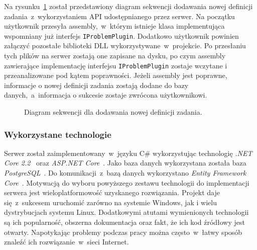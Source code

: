 \documentclass[a4paper,11pt,twoside]{report}
\theoremstyle{definition}
\begin{document}
Na rysunku~\ref{task-definition-sequence-diagram} został przedstawiony diagram sekwencji dodawania nowej definicji zadania~z~wykorzystaniem API udostępnianego przez serwer. 
Na początku użytkownik przesyła assembly,~w~którym istnieje klasa implementująca wspomniany już interfejs \texttt{IProblemPlugin}.
Dodatkowo użytkownik powinien załączyć pozostałe biblioteki DLL wykorzystywane~w~projekcie.
Po przesłaniu tych plików na serwer zostają one zapisane na dysku, po czym assembly zawierające implementację interfejsu \texttt{IProblemPlugin} zostaje wczytane i przeanalizowane pod kątem poprawności.
Jeżeli assembly jest poprawne, informacje o nowej definicji zadania zostają dodane do bazy danych,~a~informacja o sukcesie zostaje zwrócona użytkownikowi.

\begin{figure} 
    \caption{Diagram sekwencji dla dodawania nowej definicji zadania.}
    \label{task-definition-sequence-diagram}
\end{figure}

\subsubsection{Wykorzystane technologie}
Serwer został zaimplementowany~w~języku C\# wykorzystując technologię \textit{.NET Core 2.2}~\cite{dotnet-core} oraz \textit{ASP.NET Core}~\cite{aspnet-core}. Jako baza danych wykorzystana została baza \textit{PostgreSQL}~\cite{postgresql}. Do komunikacji~z~bazą danych wykorzystano \textit{Entity Framework Core}~\cite{ef-core}. 
Motywacją do wyboru powyższego zestawu technologii do implementacji serwera jest wieloplatformowość uzyskanego rozwiązania. 
Projekt daje się~z~sukcesem uruchomić zarówno na systemie Windows, jak i wielu dystrybucjach systemu Linux. 
Dodatkowymi atutami wymienionych technologii są ich popularność, obszerna dokumentacja oraz fakt, że ich kod źródłowy jest otwarty. Napotykając problemy podczas pracy można często~w~łatwy sposób znaleźć ich rozwiązanie~w~sieci Internet.
\end{document}
